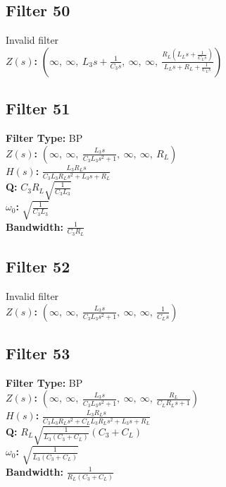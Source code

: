 \documentclass{article}
\begin{document}
\subsection*{Filter 50}
Invalid filter \\ 
\textbf{$Z(s)$:} $\left( \infty, \  \infty, \  L_{3} s + \frac{1}{C_{3} s}, \  \infty, \  \infty, \  \frac{R_{L} \left(L_{L} s + \frac{1}{C_{L} s}\right)}{L_{L} s + R_{L} + \frac{1}{C_{L} s}}\right)$ \\ 
\subsection*{Filter 51}
\textbf{Filter Type:} BP \\ 
\textbf{$Z(s)$:} $\left( \infty, \  \infty, \  \frac{L_{3} s}{C_{3} L_{3} s^{2} + 1}, \  \infty, \  \infty, \  R_{L}\right)$ \\ 
\textbf{$H(s)$:} $\frac{L_{3} R_{L} s}{C_{3} L_{3} R_{L} s^{2} + L_{3} s + R_{L}}$ \\ 
\textbf{Q:} $C_{3} R_{L} \sqrt{\frac{1}{C_{3} L_{3}}}$ \\ 
\textbf{$\omega_0$:} $\sqrt{\frac{1}{C_{3} L_{3}}}$ \\ 
\textbf{Bandwidth:} $\frac{1}{C_{3} R_{L}}$ \\ 
\subsection*{Filter 52}
Invalid filter \\ 
\textbf{$Z(s)$:} $\left( \infty, \  \infty, \  \frac{L_{3} s}{C_{3} L_{3} s^{2} + 1}, \  \infty, \  \infty, \  \frac{1}{C_{L} s}\right)$ \\ 
\subsection*{Filter 53}
\textbf{Filter Type:} BP \\ 
\textbf{$Z(s)$:} $\left( \infty, \  \infty, \  \frac{L_{3} s}{C_{3} L_{3} s^{2} + 1}, \  \infty, \  \infty, \  \frac{R_{L}}{C_{L} R_{L} s + 1}\right)$ \\ 
\textbf{$H(s)$:} $\frac{L_{3} R_{L} s}{C_{3} L_{3} R_{L} s^{2} + C_{L} L_{3} R_{L} s^{2} + L_{3} s + R_{L}}$ \\ 
\textbf{Q:} $R_{L} \sqrt{\frac{1}{L_{3} \left(C_{3} + C_{L}\right)}} \left(C_{3} + C_{L}\right)$ \\ 
\textbf{$\omega_0$:} $\sqrt{\frac{1}{L_{3} \left(C_{3} + C_{L}\right)}}$ \\ 
\textbf{Bandwidth:} $\frac{1}{R_{L} \left(C_{3} + C_{L}\right)}$ \\ 
\end{document}
